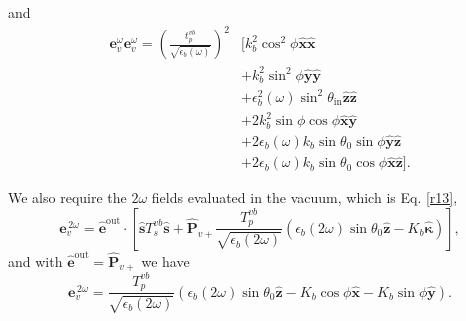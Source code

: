 and
\begin{equation*}
\begin{split}
\mathbf{e}^{\omega}_{v}\mathbf{e}^{\omega}_{v} =
\left(\frac{t^{v b}_{p}}{\sqrt{\epsilon_{b}(\omega)}}\right)^{2}
&\big[
   k^{2}_{b}\cos^{2}\phi\hat{\mathbf{x}}\hat{\mathbf{x}}\\
&+ k^{2}_{b}\sin^{2}\phi\hat{\mathbf{y}}\hat{\mathbf{y}}\\
&+ \epsilon^{2}_{b}(\omega)\sin^{2}\theta_{\mathrm{in}}
   \hat{\mathbf{z}}\hat{\mathbf{z}}\\
&+ 2k^{2}_{b}\sin\phi\cos\phi\hat{\mathbf{x}}\hat{\mathbf{y}}\\
&+ 2\epsilon_{b}(\omega)k_{b}\sin\theta_{0}\sin\phi
   \hat{\mathbf{y}}\hat{\mathbf{z}}\\
&+ 2\epsilon_{b}(\omega)k_{b}\sin\theta_{0}\cos\phi
   \hat{\mathbf{x}}\hat{\mathbf{z}}
\big].
\end{split}
\end{equation*}

We also require the $2\omega$ fields evaluated in the vacuum, which is Eq.
\eqref{r13},
\begin{equation}
\mathbf{e}^{\,2\omega}_{v} = \hat{\mathbf{e}}^{\mathrm{out}}
\cdot\left[
\hat{\mathbf{s}}T_s^{v b}\hat{\mathbf{s}} + \hat{\mathbf{P}}_{v+}
\frac{T^{v b}_{p}}{\sqrt{\epsilon_{b}(2\omega)}}
\left(
  \epsilon_{b}(2\omega)\sin\theta_{0}\hat{\mathbf{z}}
  - K_{b}\hat{\boldsymbol{\kappa}}
\right) 
\right],
\end{equation}
and with $\hat{\mathbf{e}}^{\mathrm{out}} = \hat{\mathbf{P}}_{v+}$ we have
\begin{equation}
\mathbf{e}^{\,2\omega}_{v} =
\frac{T^{v b}_{p}}{\sqrt{\epsilon_{b}(2\omega)}}
\left(
\epsilon_{b}(2\omega)\sin\theta_{0}\hat{\mathbf{z}}
- K_{b}\cos\phi\hat{\mathbf{x}}
- K_{b}\sin\phi\hat{\mathbf{y}}
\right).
\end{equation}

